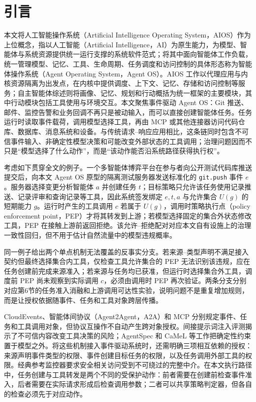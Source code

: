 \section*{引言}\label{sec:introduction-v11}

本文将人工智能操作系统（Artificial Intelligence Operating System，AIOS）作为上位概念，指以人工智能（Artificial Intelligence，AI）为原生能力，为模型、智能体与系统资源提供统一运行支撑的系统软件范式；将其中面向智能体工作负载，统一管理模型、记忆、工具、生命周期、任务调度和访问控制的具体形态称为智能体操作系统（Agent Operating System，Agent OS）。AIOS 工作以代理应用与内核资源隔离为出发点，在内核中提供调度、上下文、记忆、存储和访问控制等服务\cite{aios}；自主智能体综述则将画像、记忆、规划和行动概括为统一框架的主要模块，其中行动模块包括工具使用与环境交互\cite{agent-survey}。本文聚焦事件驱动 Agent OS：Git 推送、邮件、监控告警和业务回调不再只是被动输入，而可以直接创建智能体任务。任务运行时读取事件载荷，调用模型选择工具，再由 MCP 或其他连接器访问代码仓库、数据库、消息系统和设备。与传统请求--响应应用相比，这条链同时包含不可信事件输入、非确定性模型决策和可能改变外部状态的工具调用；治理问题因而不只是“模型选择了什么动作”，而是“该动作能否沿系统路径获得执行权”。

考虑如下贯穿全文的例子。一个多智能体博弈平台在参与者向公开测试代码库推送提交后，向本文 Agent OS 原型的隔离测试服务器发送标准化的 \texttt{git.push} 事件 $e$。服务器选择变更分析智能体 $a$ 并创建任务 $t$；目标策略只允许该任务使用记录推送、记录评审和查询记录等工具，因此系统签发绑定 $e,t,a$ 与允许集合 $U(g)$ 的短期能力 $g$。运行时产生的工具调用 $c$ 若属于 $U(g)$，调用时策略执行点（policy enforcement point，PEP）才将其转发到上游；若模型选择固定的集合外状态修改工具，PEP 在接触上游前返回拒绝。该允许--拒绝配对对应本文自有设施上的治理一致性回归，但不用于估计自然流量中的模型违规概率。

同一例子给出两个单点机制无法覆盖的反事实分支。若来源--类型声明不满足接入契约但最终选择集合内工具，仅检查工具允许集合的 PEP 无法识别该违规，应在任务创建前完成来源准入；若来源与任务均已获准，但运行时选择集合外工具，调度前 PEP 尚未观察到实际调用 $c$，必须由调用时 PEP 再次验证。两条分支分别对应第6节的任务准入消融和上游调用可达性实验，说明问题不是重复增加规则，而是让授权依据随事件、任务和工具对象跨层传播。

CloudEvents、智能体间协议（Agent2Agent，A2A）和 MCP 分别规定事件、任务和工具调用对象\cite{cloudevents,a2a,mcp}，但协议互操作不自动产生跨对象授权。间接提示词注入评测揭示了不可信内容改变工具决策的风险\cite{indirect-pi,injecagent,agentdojo,toolemu}；AgentSpec 和 CaMeL 等工作把确定性约束置于模型之外\cite{agentspec,camel}。将这些机制接入事件驱动系统时，还需明确三项相互依赖的授权：来源声明事件类型的权限、事件创建目标任务的权限，以及任务调用外部工具的权限。经典参考监控器要求安全相关访问受到不可绕过的完整中介\cite{reference-monitor,saltzer-schroeder}。在本文执行路径中，任务创建与工具转发是两个不同的受保护动作：前者需要在创建前检查事件准入，后者需要在实际请求形成后检查调用参数；二者可以共享策略判定器，但各自的检查必须先于对应动作。

